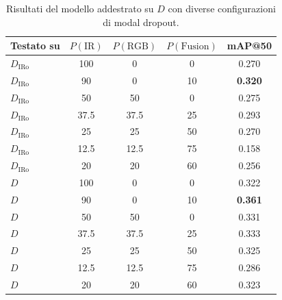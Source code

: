 \documentclass[a4paper,11pt]{article}
\begin{document}
\begin{table}[h]
\centering
\caption{Risultati del modello addestrato su $D$ con diverse configurazioni di modal dropout.}
\label{tab:all_train}
\begin{tabular}{lcccc}
\toprule
Testato su & $P(\text{IR})$ & $P(\text{RGB})$ & $P(\text{Fusion})$ & mAP@50 \\
\midrule
$D_{\text{IRo}}$ & 100 & 0 & 0 & 0.270 \\
$D_{\text{IRo}}$ & 90 & 0 & 10 & \textbf{0.320} \\
$D_{\text{IRo}}$ & 50 & 50 & 0 & 0.275 \\
$D_{\text{IRo}}$ & 37.5 & 37.5 & 25 & 0.293 \\
$D_{\text{IRo}}$ & 25 & 25 & 50 & 0.270 \\
$D_{\text{IRo}}$ & 12.5 & 12.5 & 75 & 0.158 \\
$D_{\text{IRo}}$ & 20 & 20 & 60 & 0.256 \\
\midrule
$D$ & 100 & 0 & 0 & 0.322 \\
$D$ & 90 & 0 & 10 & \textbf{0.361} \\
$D$ & 50 & 50 & 0 & 0.331 \\
$D$ & 37.5 & 37.5 & 25 & 0.333 \\
$D$ & 25 & 25 & 50 & 0.325 \\
$D$ & 12.5 & 12.5 & 75 & 0.286 \\
$D$ & 20 & 20 & 60 & 0.323 \\
\bottomrule
\end{tabular}
\end{table}
\end{document}

